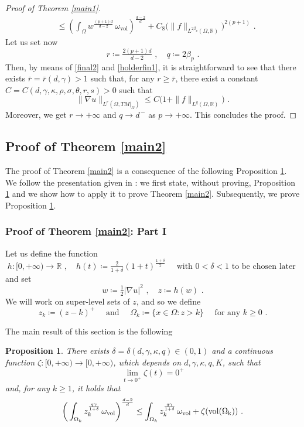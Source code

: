 \documentclass[10pt, a4paper, reqno, oneside]{amsart}
\theoremstyle{plain}
\newtheorem{prop}[theo]{Proposition}
\theoremstyle{definition}
\theoremstyle{plain}
\theoremstyle{definition}
\theoremstyle{plain}
\renewcommand{\=}{:=}
\begin{document}
\begin{proof}[Proof of Theorem \ref{main1}]
\begin{equation}
\begin{aligned}
&\leq \left(\int_\Omega w^\frac{(p+1)d}{d-2}\,\omega_{\mathrm{vol}}\right)^{\frac{d-2}d}+C_8\big(\|f\|_{L^{2\beta_p}(\Omega,\mathbb{R})}\big)^{2(p+1)} \,\, .
\end{aligned} \end{equation}
Let us set now
$$
r \coloneqq \tfrac{2(p+1)d}{d-2} \,\, , \quad q \coloneqq 2\beta_p \,\, .
$$
Then, by means of \eqref{final2} and \eqref{holderfin1}, it is straightforward to see that there exists $\bar{r}=\bar{r}(d,\gamma)>1$ such that, for any $r\geq \bar{r}$, there exist a constant $C=C(d,\gamma,\kappa,\rho,\sigma,\theta,r,s)>0$ such that
$$
\|\nabla u\|_{L^r(\Omega,TM|_{\Omega})}\leq C\big(1+\|f\|_{L^{q}(\Omega,\mathbb{R})}\big) \,\, .
$$
Moreover, we get $r \to +\infty$ and $q \to d^{\,-}$ as $p \to +\infty$. This concludes the proof.
\end{proof}

\subsection{Proof of Theorem \ref{main2}} \hfill \par

The proof of Theorem \ref{main2} is a consequence of the following Proposition \ref{mainprop2}. We follow the presentation given in \cite{CGell}: we first state, without proving, Proposition \ref{mainprop2} and we show how to apply it to prove Theorem \ref{main2}. Subsequently, we prove Proposition \ref{mainprop2}.

\subsubsection{Proof of Theorem \ref{main2}: Part I} \hfill \par

Let us define the function
$$
h: [0,+\infty) \to \mathbb{R} \,\, , \quad h(t) \coloneqq \tfrac{2}{1+\delta}(1+t)^{\frac{1+\delta}{2}} \quad \text{ with $0<\delta<1$ to be chosen later }
$$
and set
$$
w \coloneqq \tfrac12|\nabla u|^2 \,\, , \quad z \coloneqq h(w) \,\, .
$$
We will work on super-level sets of $z$, and so we define
$$
z_k \coloneqq (z-k)^+ \quad \text{ and } \quad \Omega_k\coloneqq\{x\in\Omega:z>k\} \quad \text{ for any } k \geq 0 \,\, .
$$

The main result of this section is the following

\begin{prop} \label{mainprop2}
There exists $\delta=\delta(d,\gamma,\kappa,q) \in (0,1)$ and a continuous function $\zeta: [0,+\infty) \to [0,+\infty)$, which depends on $d,\gamma,\kappa,q,K$, such that
$$
\lim_{t \to 0^+} \zeta(t) = 0^+
$$
and, for any $k \ge 1$, it holds that
\begin{equation}\label{mainest}
\bigg(\int_{\Omega_k} z_k^{\frac{q\gamma}{1+\delta}}\, \omega_{\mathrm{vol}}\bigg)^{\frac{d-2}d} \leq
\int_{\Omega_k} z_k^{\frac{q\gamma}{1+\delta}}\, \omega_{\mathrm{vol}}
+\zeta (\rm{vol}(\Omega_k)) \,\, .
\end{equation}
\end{prop}
\end{document}
